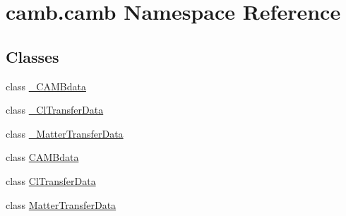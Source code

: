 \hypertarget{namespacecamb_1_1camb}{}\section{camb.\+camb Namespace Reference}
\label{namespacecamb_1_1camb}
\subsection*{Classes}
\begin{DoxyCompactItemize}
\item 
class \mbox{\hyperlink{classcamb_1_1camb_1_1__CAMBdata}{\+\_\+\+C\+A\+M\+Bdata}}
\item 
class \mbox{\hyperlink{classcamb_1_1camb_1_1__ClTransferData}{\+\_\+\+Cl\+Transfer\+Data}}
\item 
class \mbox{\hyperlink{classcamb_1_1camb_1_1__MatterTransferData}{\+\_\+\+Matter\+Transfer\+Data}}
\item 
class \mbox{\hyperlink{classcamb_1_1camb_1_1CAMBdata}{C\+A\+M\+Bdata}}
\item 
class \mbox{\hyperlink{classcamb_1_1camb_1_1ClTransferData}{Cl\+Transfer\+Data}}
\item 
class \mbox{\hyperlink{classcamb_1_1camb_1_1MatterTransferData}{Matter\+Transfer\+Data}}
\end{DoxyCompactItemize}
